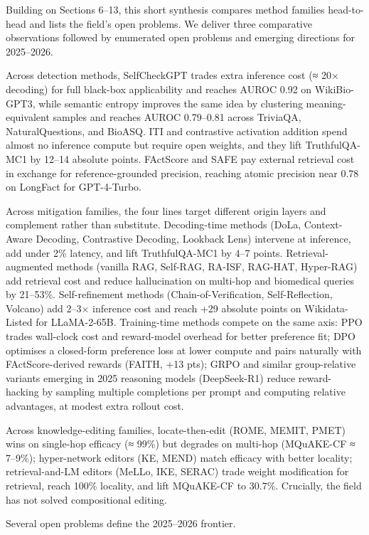 Building on Sections 6--13, this short synthesis compares method families head-to-head and lists the field's open problems. We deliver three comparative observations followed by enumerated open problems and emerging directions for 2025--2026.

Across detection methods, SelfCheckGPT trades extra inference cost (≈ 20× decoding) for full black-box applicability and reaches AUROC 0.92 on WikiBio-GPT3, while semantic entropy improves the same idea by clustering meaning-equivalent samples and reaches AUROC 0.79--0.81 across TriviaQA, NaturalQuestions, and BioASQ. ITI and contrastive activation addition spend almost no inference compute but require open weights, and they lift TruthfulQA-MC1 by 12--14 absolute points. FActScore and SAFE pay external retrieval cost in exchange for reference-grounded precision, reaching atomic precision near 0.78 on LongFact for GPT-4-Turbo.

Across mitigation families, the four lines target different origin layers and complement rather than substitute. Decoding-time methods (DoLa, Context-Aware Decoding, Contrastive Decoding, Lookback Lens) intervene at inference, add under 2\% latency, and lift TruthfulQA-MC1 by 4--7 points. Retrieval-augmented methods (vanilla RAG, Self-RAG, RA-ISF, RAG-HAT, Hyper-RAG) add retrieval cost and reduce hallucination on multi-hop and biomedical queries by 21--53\%. Self-refinement methods (Chain-of-Verification, Self-Reflection, Volcano) add 2--3× inference cost and reach +29 absolute points on Wikidata-Listed for LLaMA-2-65B. Training-time methods compete on the same axis: PPO trades wall-clock cost and reward-model overhead for better preference fit; DPO optimises a closed-form preference loss at lower compute and pairs naturally with FActScore-derived rewards (FAITH, +13 pts); GRPO and similar group-relative variants emerging in 2025 reasoning models (DeepSeek-R1) reduce reward-hacking by sampling multiple completions per prompt and computing relative advantages, at modest extra rollout cost.

Across knowledge-editing families, locate-then-edit (ROME, MEMIT, PMET) wins on single-hop efficacy (≈ 99\%) but degrades on multi-hop (MQuAKE-CF ≈ 7--9\%); hyper-network editors (KE, MEND) match efficacy with better locality; retrieval-and-LM editors (MeLLo, IKE, SERAC) trade weight modification for retrieval, reach 100\% locality, and lift MQuAKE-CF to 30.7\%. Crucially, the field has not solved compositional editing.

Several open problems define the 2025--2026 frontier.

